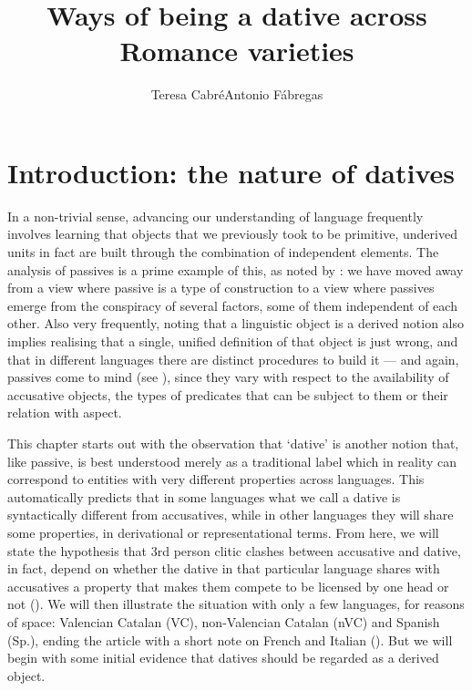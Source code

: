 \documentclass[output=paper,modfonts,nonflat,newtxmath,colorlinks,citecolor=brown]{langsci/langscibook}
\author{Teresa Cabré\affiliation{CLT-Universitat Autònoma de Barcelona}\lastand Antonio Fábregas\affiliation{University of Tromsø-Norway’s Arctic University}}
\title{Ways of being a dative across Romance varieties}
\begin{document}
\maketitle

\section{Introduction: the nature of datives} %
\label{sec:cabre:1}

In a non-trivial sense, advancing our understanding of language frequently involves learning that objects that we previously took to be primitive, underived units in fact are built through the combination of independent elements. The analysis of passives is a prime example of this, as noted by \citet{Williams2015}: we have moved away from a view where passive is a type of construction to a view where passives emerge from the conspiracy of several factors, some of them independent of each other. Also very frequently, noting that a linguistic object is a derived notion also implies realising that a single, unified definition of that object is just wrong, and that in different languages there are distinct procedures to build it — and again, passives come to mind (see \citealt{Croft2017}), since they vary with respect to the availability of accusative objects, the types of predicates that can be subject to them or their relation with aspect.

This chapter starts out with the observation that ‘dative’ is another notion that, like passive, is best understood merely as a traditional label which in reality can correspond to entities with very different properties across languages. This automatically predicts that in some languages what we call a dative is syntactically different from accusatives, while in other languages they will share some properties, in derivational or representational terms. From here, we will state the hypothesis that 3rd person clitic clashes between accusative and dative, in fact, depend on whether the dative in that particular language shares with accusatives a property that makes them compete to be licensed by one head or not (). We will then illustrate the situation with only a few languages, for reasons of space: Valencian Catalan (VC), non-Valencian Catalan (nVC) and Spanish (Sp.), ending the article with a short note on French and Italian (). But we will begin with some initial evidence that datives should be regarded as a derived object.
\end{document}
